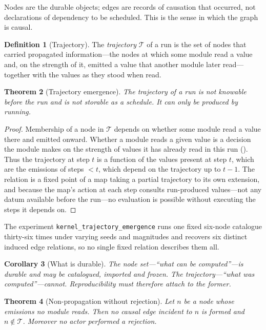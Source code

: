 \documentclass[11pt,twocolumn,a4paper]{article}
\newtheorem{theorem}{Theorem}[section]
\newtheorem{corollary}[theorem]{Corollary}
\theoremstyle{definition}
\newtheorem{definition}[theorem]{Definition}
\theoremstyle{remark}
\newcommand{\Traj}{\mathcal{T}}
\newcommand{\node}{n}
\begin{document}
Nodes are the durable objects; edges are records of causation that occurred, not
declarations of dependency to be scheduled. This is the sense in which the graph
is causal.

\begin{definition}[Trajectory]
\label{def:trajectory}
The \emph{trajectory} $\Traj$ of a run is the set of nodes that carried
propagated information---the nodes at which some module read a value and, on the
strength of it, emitted a value that another module later read---together with
the values as they stood when read.
\end{definition}

\begin{theorem}[Trajectory emergence]
\label{thm:emergence}
The trajectory of a run is not knowable before the run and is not storable as a
schedule. It can only be produced by running.
\end{theorem}

\begin{proof}
Membership of a node in $\Traj$ depends on whether some module read a value there
and emitted onward. Whether a module reads a given value is a decision the module
makes on the strength of values it has already read in this run
(). Thus the trajectory at step $t$ is a function of the
values present at step $t$, which are the emissions of steps $<t$, which depend
on the trajectory up to $t-1$. The relation is a fixed point of a map taking a
partial trajectory to its own extension, and because the map's action at each
step consults run-produced values---not any datum available before the run---no
evaluation is possible without executing the steps it depends on.
\end{proof}

The experiment \texttt{kernel\_trajectory\_emergence} runs one fixed six-node
catalogue thirty-six times under varying seeds and magnitudes and recovers six
distinct induced edge relations, so no single fixed relation describes them all.

\begin{corollary}[What is durable]
\label{cor:durable}
The node set---``what can be computed''---is durable and may be catalogued,
imported and frozen. The trajectory---``what was computed''---cannot.
Reproducibility must therefore attach to the former.
\end{corollary}

\begin{theorem}[Non-propagation without rejection]
\label{thm:nonprop}
Let $\node$ be a node whose emissions no module reads. Then no causal edge
incident to $\node$ is formed and $\node\notin\Traj$. Moreover no actor performed
a rejection.
\end{theorem}
\end{document}
